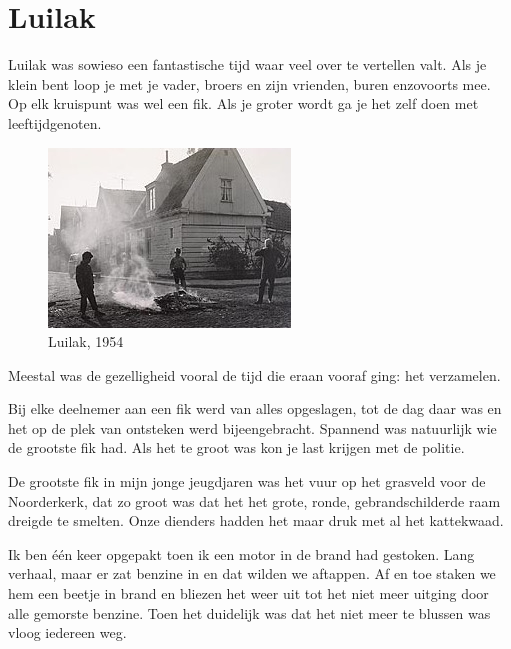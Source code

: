 \documentclass[10pt,twoside, openright]{memoir}
\begin{document}
\chapter{Luilak} %
\label{cha:luilak}

Luilak was sowieso een fantastische tijd waar veel over te vertellen valt. Als je klein bent loop je met je vader, broers en zijn vrienden, buren enzovoorts mee. Op elk kruispunt was wel een fik. Als je groter wordt ga je het zelf doen met leeftijdgenoten. 

\begin{figure}
\includegraphics[width=\textwidth]{img/ch9/luilak1954}
\caption*{\footnotesize Luilak, 1954}
\end{figure}

Meestal was de gezelligheid vooral de tijd die eraan vooraf ging: het verzamelen. 

Bij elke deelnemer aan een fik werd van alles opgeslagen, tot de dag daar was en het op de plek van ontsteken werd bijeengebracht. Spannend was natuurlijk wie de grootste fik had. Als het te groot was kon je last krijgen met de politie.

De grootste fik in mijn jonge jeugdjaren was het vuur op het grasveld voor de Noorderkerk, dat zo groot was dat het het grote, ronde, gebrandschilderde raam dreigde te smelten. Onze dienders hadden het maar druk met al het kattekwaad. 

Ik ben één keer opgepakt toen ik een motor in de brand had gestoken. Lang verhaal, maar er zat benzine in en dat wilden we aftappen. Af en toe staken we hem een beetje in brand en bliezen het weer uit tot het niet meer uitging door alle gemorste benzine. Toen het duidelijk was dat het niet meer te blussen was vloog iedereen weg. 
\end{document}
